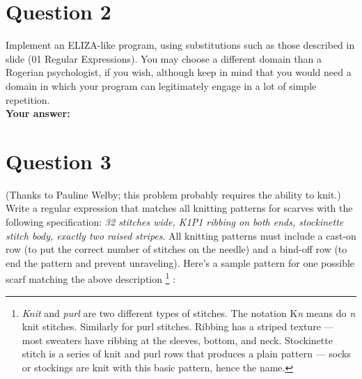 \documentclass[a4paper]{article}
\begin{document}
\section{Question 2}
Implement an ELIZA-like program, using substitutions such as those described in slide (01 Regular Expressions). 
You may choose a different domain than a Rogerian psychologist, if you wish, although keep in mind that you would need a domain in which your
program can legitimately engage in a lot of simple repetition.\\

\textbf{Your answer:}


\section{Question 3}
(Thanks to Pauline Welby; this problem probably requires the ability to knit.)
Write a regular expression that matches all knitting patterns for scarves with the following specification: \textit{32 stitches wide, K1P1 ribbing on both ends, stockinette stitch body, exactly two raised stripes}. 
All knitting patterns must include a cast-on row (to put the correct number of stitches on the needle) and a bind-off row (to end the pattern and prevent unraveling). 
Here’s a sample pattern for one possible scarf matching the above description 
\footnote{\textit{Knit} and \textit{purl} are two different types of stitches.
The notation K\textit{n} means do \textit{n} knit stitches.
Similarly for purl stitches. Ribbing has a striped texture --- most sweaters have ribbing at the sleeves, bottom, and neck.
Stockinette stitch is a series of knit and purl rows that produces a plain pattern --- socks or stockings are knit with this basic pattern, hence the name.} :\\
\end{document}
